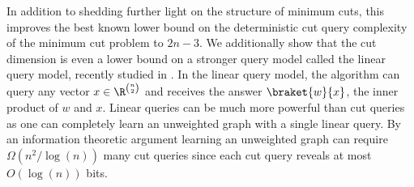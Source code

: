 In addition to shedding further light on the structure of minimum cuts, this improves the best known lower bound on the deterministic cut query complexity of
the minimum cut problem to $2n-3$.  We additionally show that the cut dimension is even a lower bound on a stronger query model called the linear query model, recently
studied in \cite{ACK20}.  In the linear query model, the algorithm can query any vector $x \in \R^{\binom{n}{2}}$ and receives the answer $\braket{w}{x}$, the
inner product of $w$ and $x$.  Linear queries can be much more powerful than cut queries as one can completely learn an unweighted graph with a single linear query.
By an information theoretic argument learning an unweighted graph can require $\Omega(n^2/\log(n))$ many cut queries since each cut query reveals at most
$O(\log (n))$ bits.




















































































